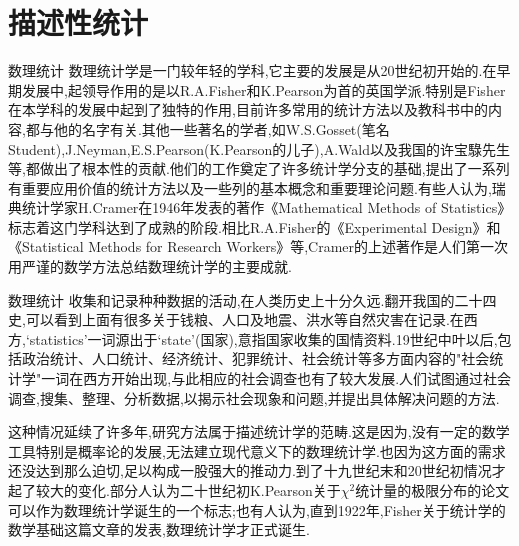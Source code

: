 \section{描述性统计}
    
    \frame{\sectionpage}
    
    \begin{frame}{数理统计}
数理统计学是一门较年轻的学科,它主要的发展是从20世纪初开始的.在早期发展中,起领导作用的是以R.A.Fisher和K.Pearson为首的英国学派.特别是Fisher在本学科的发展中起到了独特的作用,目前许多常用的统计方法以及教科书中的内容,都与他的名字有关.其他一些著名的学者,如W.S.Gosset(笔名Student),J.Neyman,E.S.Pearson(K.Pearson的儿子),A.Wald以及我国的许宝騄先生等,都做出了根本性的贡献.他们的工作奠定了许多统计学分支的基础,提出了一系列有重要应用价值的统计方法以及一些列的基本概念和重要理论问题.有些人认为,瑞典统计学家H.Cramer在1946年发表的著作《Mathematical Methods of Statistics》标志着这门学科达到了成熟的阶段.相比R.A.Fisher的《Experimental Design》和《Statistical Methods for Research Workers》等,Cramer的上述著作是人们第一次用严谨的数学方法总结数理统计学的主要成就.
\end{frame}


\begin{frame}{数理统计}
收集和记录种种数据的活动,在人类历史上十分久远.翻开我国的二十四史,可以看到上面有很多关于钱粮、人口及地震、洪水等自然灾害在记录.在西方,‘statistics’一词源出于‘state'(国家),意指国家收集的国情资料.19世纪中叶以后,包括政治统计、人口统计、经济统计、犯罪统计、社会统计等多方面内容的"社会统计学"一词在西方开始出现,与此相应的社会调查也有了较大发展.人们试图通过社会调查,搜集、整理、分析数据,以揭示社会现象和问题,并提出具体解决问题的方法.

这种情况延续了许多年,研究方法属于描述统计学的范畴.这是因为,没有一定的数学工具特别是概率论的发展,无法建立现代意义下的数理统计学.也因为这方面的需求还没达到那么迫切,足以构成一股强大的推动力.到了十九世纪末和20世纪初情况才起了较大的变化.部分人认为二十世纪初K.Pearson关于$\chi^2$统计量的极限分布的论文可以作为数理统计学诞生的一个标志;也有人认为,直到1922年,Fisher关于统计学的数学基础这篇文章的发表,数理统计学才正式诞生.

\end{frame}

